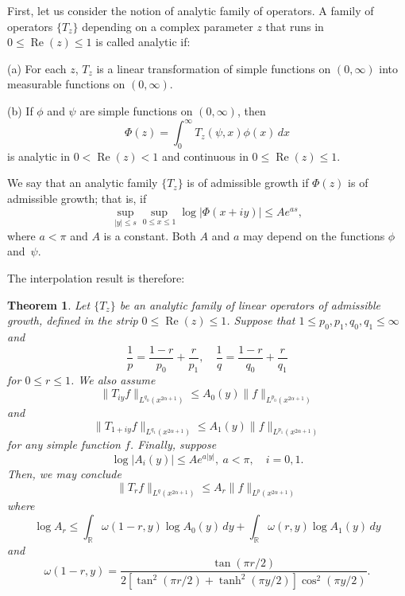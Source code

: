 \documentclass{amsart}
\newtheorem{thm}{Theorem}
\theoremstyle{remark}
\newcommand{\R}{\mathbb{R}}
\renewcommand{\Re}{\operatorname{Re}}
\newcommand{\lpnorm}[2]{\|{#1}\|_{L^{#2}(x^{2\alpha+1})}}
\begin{document}
First, let us consider the notion of analytic family of operators. A family of
operators $\{T_z\}$ depending on a complex parameter $z$ that runs in
$0 \le \Re(z) \le 1$ is called analytic if:

(a) For each $z$, $T_z$ is a linear transformation of simple functions on
$(0,\infty)$ into measurable functions on $(0,\infty)$.

(b) If $\phi$ and $\psi$ are simple functions on $(0,\infty)$, then
\begin{equation*}
    \Phi(z) = \int_0^\infty T_z(\psi,x)\phi(x) \, dx
\end{equation*}
is analytic in $0 < \Re(z) < 1$ and continuous in $0 \le \Re(z) \le 1$.

We say that an analytic family $\{T_z\}$ is of admissible growth if $\Phi(z)$
is of admissible growth; that is, if
\begin{equation*}
    \sup_{|y|\le s} \sup_{0 \le x \le 1} \log |\Phi(x+iy)| \le Ae^{as},
\end{equation*}
where $a<\pi$ and $A$ is a constant. Both $A$ and $a$ may depend on the
functions $\phi$ and~$\psi$.

The interpolation result is therefore:
\begin{thm}
\label{thm:interpolacion}
Let $\{T_z\}$ be an analytic family of linear operators of admissible growth,
defined in the strip $0 \le \Re(z) \le 1$. Suppose that
$1 \le p_0,p_1,q_0,q_1 \le \infty$ and
\begin{equation*}
    \frac{1}{p} = \frac{1-r}{p_0} + \frac{r}{p_1},
    \quad
    \frac{1}{q} = \frac{1-r}{q_0} + \frac{r}{q_1}
\end{equation*}
for $0 \le r \le 1$. We also assume
\begin{equation}
\label{ec:cotasTiy}
    \lpnorm{T_{iy}f}{q_0} \le A_0(y) \lpnorm{f}{p_0}
\end{equation}
and
\begin{equation}
\label{ec:cotasT1+iy}
    \lpnorm{T_{1+iy}f}{q_1} \le A_1(y) \lpnorm{f}{p_1}
\end{equation}
for any simple function $f$. Finally, suppose
\begin{equation*}
    \log{|A_i(y)|} \le Ae^{a|y|},\ a<\pi, \quad i = 0,1.
\end{equation*}
Then, we may conclude
\begin{equation}
\label{ec:tesisStein}
    \lpnorm{T_r f}{q} \le A_r \lpnorm{f}{p}
\end{equation}
where
\begin{equation*}
    \log{A_r} \le \int_{\R} \omega(1-r,y) \log{A_0(y)} \, dy
      + \int_{\R} \omega(r,y) \log{A_1(y)} \, dy
\end{equation*}
and
\begin{equation*}
    \omega(1-r,y) = \frac{\tan(\pi r/2)}%
          {2 [\tan^2(\pi r/2)+\tanh^2(\pi y/2)] \cos^2(\pi y/2)}.
\end{equation*}
\end{thm}
\end{document}
